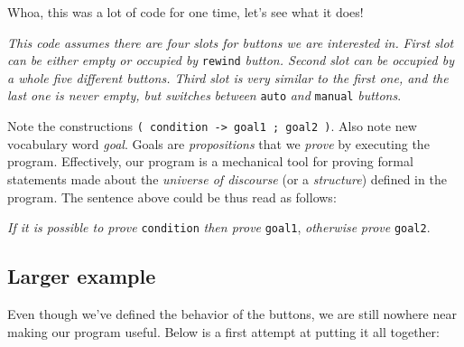 \documentclass[11pt]{article}
\begin{document}
Whoa, this was a lot of code for one time, let's see what it does!

\emph{This code assumes there are four slots for buttons we are interested in.}
\emph{First slot can be either empty or occupied by} \texttt{rewind} \emph{button.  Second}
\emph{slot can be occupied by a whole five different buttons.  Third slot is}
\emph{very similar to the first one, and the last one is never empty, but switches}
\emph{between} \texttt{auto} \emph{and} \texttt{manual} \emph{buttons}.

Note the constructions \texttt{( condition -> goal1 ; goal2 )}. Also note new
vocabulary word \emph{goal}.  Goals are \emph{propositions} that we \emph{prove} by executing
the program.  Effectively, our program is a mechanical tool for proving formal
statements made about the \emph{universe of discourse} (or a \emph{structure}) defined
in the program.  The sentence above could be thus read as follows:

\emph{If it is possible to prove} \texttt{condition} \emph{then prove} \texttt{goal1}, \emph{otherwise}
\emph{prove} \texttt{goal2}.
\subsection{Larger example}
\label{sec-2-3}

Even though we've defined the behavior of the buttons, we are still nowhere
near making our program useful.  Below is a first attempt at putting it all
together:
\end{document}
